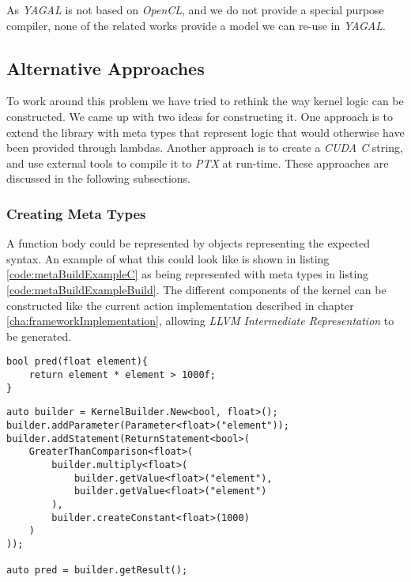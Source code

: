As \textit{YAGAL} is not based on \textit{OpenCL}, and we do not provide a special purpose compiler, none of the related works provide a model we can re-use in \textit{YAGAL}.

\subsection{Alternative Approaches}
To work around this problem we have tried to rethink the way kernel logic can be constructed. We came up with two ideas for constructing it. One approach is to extend the library with meta types that represent logic that would otherwise have been provided through lambdas. Another approach is to create a \textit{CUDA C} string, and use external tools to compile it to \textit{PTX} at run-time. These approaches are discussed in the following subsections.

\subsubsection{Creating Meta Types}
A function body could be represented by objects representing the expected syntax. An example of what this could look like is shown in listing \ref{code:metaBuildExampleC} as being represented with meta types in listing \ref{code:metaBuildExampleBuild}. The different components of the kernel can be constructed like the current action implementation described in chapter \ref{cha:frameworkImplementation}, allowing \textit{LLVM Intermediate Representation} to be generated. 

\begin{lstlisting}[caption={Pseudo C code showing a kernel function.}, label={code:metaBuildExampleC}]
bool pred(float element){
    return element * element > 1000f;
}
\end{lstlisting}

\begin{lstlisting}[caption={Code showing how construction of kernel function in a meta type solution could be done.}, label={code:metaBuildExampleBuild}]
auto builder = KernelBuilder.New<bool, float>();
builder.addParameter(Parameter<float>("element"));
builder.addStatement(ReturnStatement<bool>(
    GreaterThanComparison<float>(
        builder.multiply<float>(
            builder.getValue<float>("element"), 
            builder.getValue<float>("element")
        ), 
        builder.createConstant<float>(1000)
    )
));

auto pred = builder.getResult();
\end{lstlisting}

